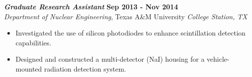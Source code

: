 {\sl\bf Graduate Research Assistant} \hfill {\bf Sep 2013 - Nov 2014} \\
{\sl Department of Nuclear Engineering}, Texas A\&M University \hfill {\sl College Station, TX} %
\vspace{2pt}
\begin{itemize}[leftmargin=4ex] \itemsep -2pt
\item Investigated the use of silicon photodiodes to enhance scintillation detection capabilities.
\item Designed and constructed a multi-detector (NaI) housing for a vehicle-mounted radiation detection system.
\end{itemize} 
